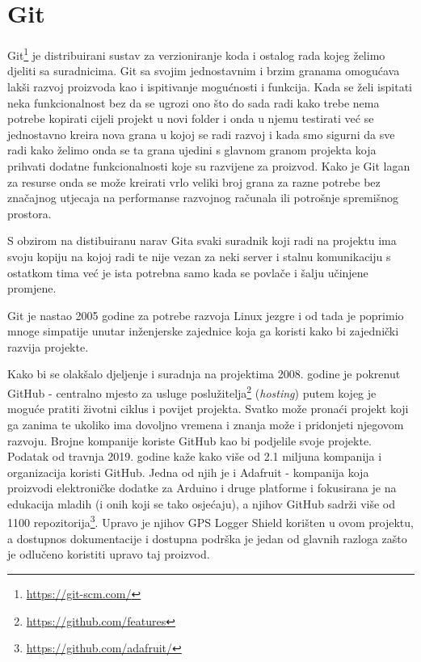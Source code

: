 \section{Git}
Git\footnote{\href{https://git-scm.com/}{https://git-scm.com/}} je distribuirani sustav za verzioniranje koda i ostalog rada kojeg želimo djeliti sa suradnicima.
Git sa svojim jednostavnim i brzim granama omogućava lakši razvoj proizvoda kao i ispitivanje mogućnosti i funkcija.
Kada se želi ispitati neka funkcionalnost bez da se ugrozi ono što do sada radi kako trebe nema potrebe kopirati cijeli projekt u novi folder i onda u njemu testirati već se jednostavno kreira nova grana u kojoj se radi razvoj i kada smo sigurni da sve radi kako želimo onda se ta grana ujedini s glavnom granom projekta koja prihvati dodatne funkcionalnosti koje su razvijene za proizvod.
Kako je Git lagan za resurse onda se može kreirati vrlo veliki broj grana za razne potrebe bez značajnog utjecaja na performanse razvojnog računala ili potrošnje spremišnog prostora.

S obzirom na distibuiranu narav Gita svaki suradnik koji radi na projektu ima svoju kopiju na kojoj radi te nije vezan za neki server i stalnu komunikaciju s ostatkom tima već je ista potrebna samo kada se povlače i šalju učinjene promjene.

Git je nastao 2005 godine za potrebe razvoja Linux jezgre i od tada je poprimio mnoge simpatije unutar inženjerske zajednice koja ga koristi kako bi zajednički razvija projekte.

Kako bi se olakšalo djeljenje i suradnja na projektima 2008. godine je pokrenut GitHub - centralno mjesto za usluge poslužitelja\footnote{\href{https://github.com/features}{https://github.com/features}} (\textit{hosting}) putem kojeg je moguće pratiti životni ciklus i povijet projekta.
Svatko može pronaći projekt koji ga zanima te ukoliko ima dovoljno vremena i znanja može i pridonjeti njegovom razvoju.
Brojne kompanije koriste GitHub kao bi podjelile svoje projekte. Podatak od travnja 2019. godine kaže kako više od 2.1 miljuna kompanija i organizacija koristi GitHub.
Jedna od njih je i Adafruit - kompanija koja proizvodi elektroničke dodatke za Arduino i druge platforme i fokusirana je na edukacija mladih (i onih koji se tako osjećaju), a njihov GitHub sadrži više od 1100 repozitorija\footnote{\href{https://github.com/adafruit}{https://github.com/adafruit/}}.
Upravo je njihov GPS Logger Shield korišten u ovom projektu, a dostupnos dokumentacije i dostupna podrška je jedan od glavnih razloga zašto je odlučeno koristiti upravo taj proizvod.
